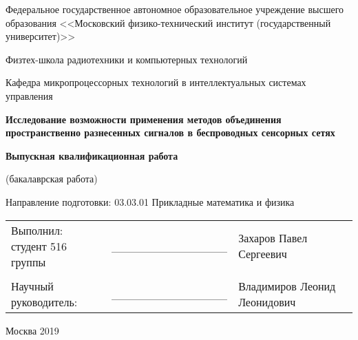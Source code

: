 \begin{titlepage}
\thispagestyle{empty}

{\centering
Федеральное государственное автономное образовательное учреждение высшего образования 
<<Московский физико{}-технический институт (государственный университет)>>\par}

\bigskip
{\centering
Физтех-школа радиотехники и компьютерных технологий \par}

\bigskip
{\centering 
Кафедра микропроцессорных технологий в интеллектуальных системах управления
\par}


\bigskip

\bigskip


\vfill

{\centering\Large\bfseries
\textbf{Исследование возможности применения методов объединения пространственно разнесенных сигналов в беспроводных сенсорных сетях}
\par}

\bigskip

{\centering\bfseries
Выпускная квалификационная работа

(бакалаврская работа)

\bigskip
Направление подготовки: 03.03.01 Прикладные математика и физика
\par}

\vfill

\begin{tabular}{lll}\\
\specialcell{Выполнил:\\студент 516 группы}  & ______________ & Захаров Павел Сергеевич \\
                     &                &                  \\
Научный руководитель: & ______________ & Владимиров Леонид Леонидович \\
\end{tabular}

\vfill

{\centering
Москва 
2019
\par}

\end{titlepage}
